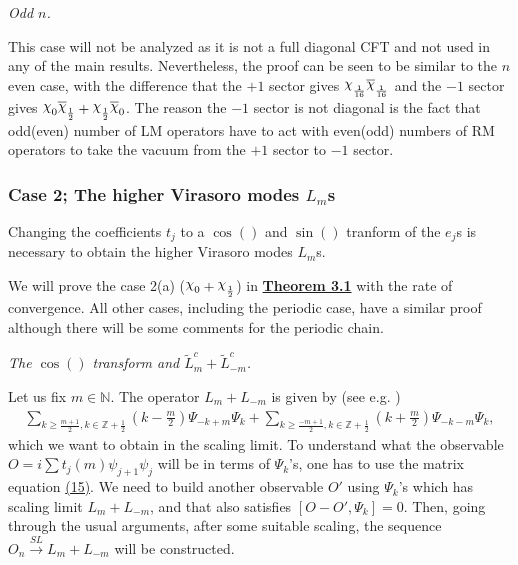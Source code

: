 \documentclass[twoside,11pt,titlepage]{amsart}
\renewcommand{\=}[1]{\stackrel{#1}{=}} %
\theoremstyle{definition}
\theoremstyle{remark}
\DeclareRobustCommand{\rchi}{{\mathpalette\irchi\relax}}
\newcommand{\irchi}[2]{\raisebox{\depth}{$#1\chi$}}
\begin{document}
\textit{Odd $n$.}

This case will not be analyzed as it is not a full diagonal CFT and not used in any of the main results. Nevertheless, the proof can be seen to be similar to the $n$ even case, with the difference that the $+1$ sector gives $\rchi_\frac{1}{16}\overline{\rchi}_\frac{1}{16}$ and the $-1$ sector gives $\rchi_0\overline{\rchi}_\frac{1}{2}+\rchi_{\frac{1}{2}}\overline{\rchi}_{0}$. The reason the $-1$ sector is not diagonal is the fact that odd(even) number of LM operators have to act with even(odd) numbers of RM operators to take the vacuum from the $+1$ sector to $-1$ sector.

\subsubsection*{\textbf{Case 2; The higher Virasoro modes $L_m$s}}

\hfill \break

Changing the coefficients $t_j$ to a $\cos()$ and $\sin()$ tranform of the $e_j$s is necessary to obtain the higher Virasoro modes $L_m$s.

We will prove the case 2(a) ($\rchi_0+\rchi_{\frac{1}{2}}$) in \hyperref[thm3.1]{\textbf{Theorem 3.1}} with the rate of convergence. All other cases, including the periodic case, have a similar proof although there will be some comments for the periodic chain.
\hfill \break

\textit{The $\cos()$ transform and $\widetilde{L}_m^c+\widetilde{L}_{-m}^c$.}

\hfill \break
Let us fix $m \in \mathbb{N}$. The operator $L_{m}+L_{-m}$ is given by (see e.g. \cite{francesco2012conformal})
\begin{align}\label{eq29}
\sum_{k \ge \frac{m+1}{2},k \in \mathbb{Z}+\frac{1}{2}} (k-\frac{m}{2}) \Psi_{-k+m}\Psi_{k}+\sum_{k \ge \frac{-m+1}{2},k \in \mathbb{Z}+\frac{1}{2}} (k+\frac{m}{2}) \Psi_{-k-m}\Psi_{k},
\end{align}
which we want to obtain in the scaling limit. To understand what the observable $O=i\sum t_j(m)\psi_{j+1}\psi_{j}$ will be in terms of $\Psi_k$'s, one has to use the matrix equation \hyperref[eq15]{(15)}. We need to build another observable $O'$ using $\Psi_k$'s which has scaling limit $L_{m}+L_{-m}$, and that also satisfies $[O-O',\Psi_k]=0$. Then, going through the usual arguments, after some suitable scaling, the sequence $O_n \xrightarrow{SL} L_m+L_{-m}$ will be constructed.
\end{document}
